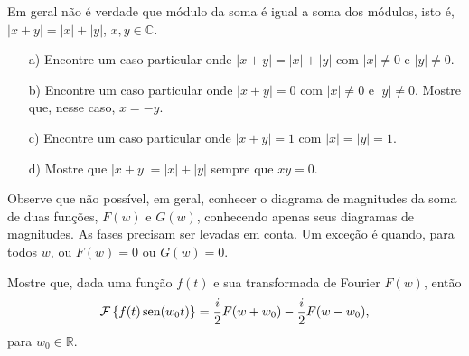 \begin{Exercise} Em geral não é verdade que módulo da soma é igual a soma dos módulos, isto é, $|x+y|=|x|+|y|$, $x,y\in\mathbb{C}$.
\begin{itemize}
\item[a)] Encontre um caso particular onde $|x+y|=|x|+|y|$ com $|x|\neq 0$ e $|y|\neq 0$.
\item[b)] Encontre um caso particular onde $|x+y|=0$ com $|x|\neq 0$ e $|y|\neq 0$. Mostre que, nesse caso, $x=-y$.
\item[c)] Encontre um caso particular onde $|x+y|=1$ com $|x|=|y|=1$.
\item[d)] Mostre que $|x+y|=|x|+|y|$ sempre que $xy=0$.
\end{itemize}
Observe que não possível, em geral, conhecer o diagrama de magnitudes da soma de duas funções, $F(w)$ e $G(w)$, conhecendo apenas seus diagramas de magnitudes. As fases precisam ser levadas em conta. Um exceção é quando, para todos $w$, ou $F(w)=0$ ou $G(w)=0$.
\end{Exercise}
\begin{Exercise}{\label{ex_mod_sin}}Mostre que, dada uma função $f(t)$ e sua transformada de Fourier $F(w)$, então
$$
\mathcal{F}\left\{f(t)\operatorname{sen}(w_0t) \right\}=\frac{i}{2}F(w+w_0)-\frac{i}{2 }F(w-w_0),
$$
para $w_0\in\mathbb{R}$.

\end{Exercise}

